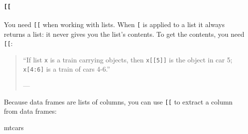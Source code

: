 \documentclass[
]{book}
\newenvironment{Shaded}{\begin{snugshade}}{\end{snugshade}}
\newcommand{\NormalTok}[1]{#1}
\begin{document}
\paragraph{\texorpdfstring{\texttt{{[}{[}}}{{[}{[}}}\label{section}

You need \texttt{{[}{[}} when working with lists. When \texttt{{[}} is applied to a list it always returns a list: it never gives you the list's contents. To get the contents, you need \texttt{{[}{[}}:

\begin{quote}
``If list \texttt{x} is a train carrying objects, then \texttt{x{[}{[}5{]}{]}} is
the object in car 5; \texttt{x{[}4:6{]}} is a train of cars 4-6.''

--- \citet{RLangTip}
\end{quote}

Because data frames are lists of columns, you can use \texttt{{[}{[}} to extract a column from data frames:

\begin{Shaded}
\begin{Highlighting}[]
\NormalTok{mtcars}
\end{Highlighting}
\end{Shaded}
\end{document}
